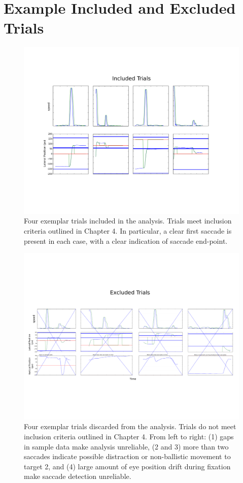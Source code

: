 \appendix
\chapter{Example Included and Excluded Trials}
\label{app}

\begin{figure}[p]
\includegraphics[width=\textwidth]{appendix/accepted}
\caption{Four exemplar trials included in the analysis. Trials meet inclusion
criteria outlined in Chapter 4. In particular, a clear first saccade is present
in each case, with a clear indication of saccade end-point.}
\end{figure}

\begin{figure}[p]
\includegraphics[width=\textwidth]{appendix/rejected}
\caption{Four exemplar trials discarded from the analysis. Trials do not meet
inclusion criteria outlined in Chapter 4. From left to right: (1) gaps in sample
data make analysis unreliable, (2 and 3) more than two saccades indicate possible distraction
or non-ballistic movement to target 2, and (4) large amount of eye position drift
during fixation make saccade detection unreliable.}
\end{figure}
